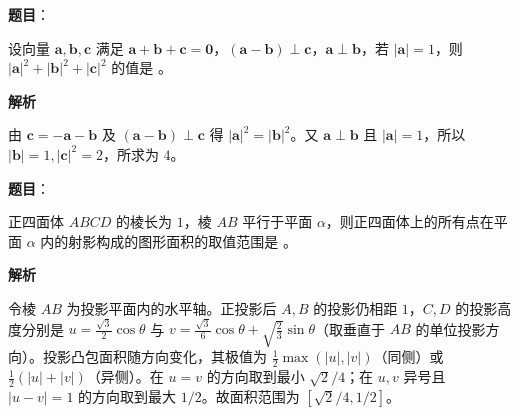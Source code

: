\begin{answer}

\textbf{题目}：

设向量 $\boldsymbol a,\boldsymbol b,\boldsymbol c$ 满足 $\boldsymbol a+\boldsymbol b+\boldsymbol c=\boldsymbol0$，$(\boldsymbol a-\boldsymbol b)\perp\boldsymbol c$，$\boldsymbol a\perp\boldsymbol b$，若 $|\boldsymbol a|=1$，则 $|\boldsymbol a|^2+|\boldsymbol b|^2+|\boldsymbol c|^2$ 的值是 \gkblank{}。

\textbf{解析}

由 $\boldsymbol c=-\boldsymbol a-\boldsymbol b$ 及 $(\boldsymbol a-\boldsymbol b)\perp\boldsymbol c$ 得 $|\boldsymbol a|^2=|\boldsymbol b|^2$。又 $\boldsymbol a\perp\boldsymbol b$ 且 $|\boldsymbol a|=1$，所以 $|\boldsymbol b|=1,|\boldsymbol c|^2=2$，所求为 $4$。


\end{answer}
\begin{answer}

\textbf{题目}：

正四面体 $ABCD$ 的棱长为 $1$，棱 $AB$ 平行于平面 $\alpha$，则正四面体上的所有点在平面 $\alpha$ 内的射影构成的图形面积的取值范围是 \gkblank{}。
\nopagebreak[4]
\begin{center}\end{center}
\nopagebreak[4]
\textbf{解析}

令棱 $AB$ 为投影平面内的水平轴。正投影后 $A,B$ 的投影仍相距 $1$，$C,D$ 的投影高度分别是 $u=\frac{\sqrt3}{2}\cos\theta$ 与 $v=\frac{\sqrt3}{6}\cos\theta+\sqrt{\frac23}\sin\theta$（取垂直于 $AB$ 的单位投影方向）。投影凸包面积随方向变化，其极值为 $\frac12\max(|u|,|v|)$（同侧）或 $\frac12(|u|+|v|)$（异侧）。在 $u=v$ 的方向取到最小 $\sqrt2/4$；在 $u,v$ 异号且 $|u-v|=1$ 的方向取到最大 $1/2$。故面积范围为 $[\sqrt2/4,1/2]$。


\end{answer}
